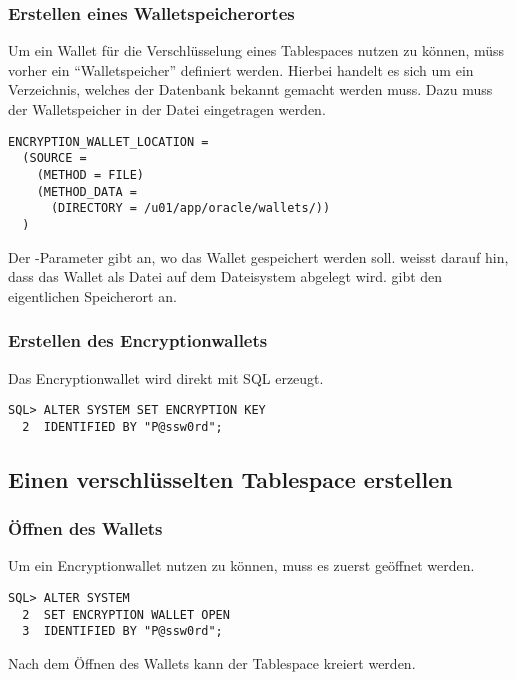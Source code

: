         \subsubsection{Erstellen eines Walletspeicherortes}
          Um ein Wallet f\"ur die Verschl\"usselung eines Tablespaces nutzen zu
          k\"onnen, m\"uss vorher ein \enquote{Walletspeicher} definiert werden.
          Hierbei handelt es sich um ein Verzeichnis, welches der Datenbank
          bekannt gemacht werden muss. Dazu muss der Walletspeicher in der Datei
           eingetragen werden.
          \begin{lstlisting}[caption={Ein Encryptionwallet
          registrieren},label=admin837,language=configfile]
ENCRYPTION_WALLET_LOCATION =
  (SOURCE =
    (METHOD = FILE)
    (METHOD_DATA =
      (DIRECTORY = /u01/app/oracle/wallets/))
  )
          \end{lstlisting}
          Der -Parameter  gibt an, wo das Wallet gespeichert werden soll.  weisst darauf hin, dass das Wallet als Datei auf dem Dateisystem abgelegt wird.  gibt den eigentlichen Speicherort an.
        \subsubsection{Erstellen des Encryptionwallets}
          Das Encryptionwallet wird direkt mit SQL erzeugt.
          \begin{lstlisting}[caption={Ein Encryptionwallet erzeugen},label=admin838,language=oracle_sql]
SQL> ALTER SYSTEM SET ENCRYPTION KEY
  2  IDENTIFIED BY "P@ssw0rd";
          \end{lstlisting}
      \subsection{Einen verschl\"usselten Tablespace erstellen}
        \subsubsection{\"Offnen des Wallets}
          Um ein Encryptionwallet nutzen zu k\"onnen, muss es zuerst ge\"offnet werden.
          \begin{lstlisting}[caption={Ein Encryptionwallet \"offnen},label=admin839,language=oracle_sql]
SQL> ALTER SYSTEM
  2  SET ENCRYPTION WALLET OPEN
  3  IDENTIFIED BY "P@ssw0rd";
          \end{lstlisting}
          Nach dem \"Offnen des Wallets kann der Tablespace kreiert werden.
